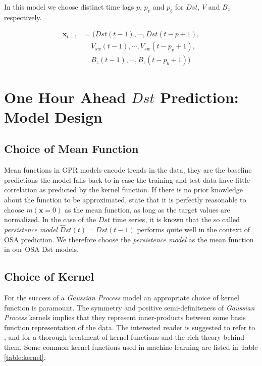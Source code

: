 \documentclass{article}
\providecommand{\DIFadd}[1]{{\protect\color{blue}\uwave{#1}}} %
\providecommand{\DIFdel}[1]{{\protect\color{red}\sout{#1}}}                      %
\providecommand{\DIFaddbegin}{} %
\providecommand{\DIFaddend}{} %
\providecommand{\DIFdelbegin}{} %
\providecommand{\DIFdelend}{} %
\newcommand{\DIFscaledelfig}{0.5}
\newlength{\DIFdelgraphicswidth} %
\newlength{\DIFdelgraphicsheight} %
\newcommand{\DIFaddincludegraphics}[2][]{{\color{blue}\fbox{\DIFOincludegraphics[#1]{#2}}}} %
\newcommand{\DIFdelincludegraphics}[2][]{%
\sbox{\DIFdelgraphicsbox}{\DIFOincludegraphics[#1]{#2}}%
\settoboxwidth{\DIFdelgraphicswidth}{\DIFdelgraphicsbox} %
\settoboxtotalheight{\DIFdelgraphicsheight}{\DIFdelgraphicsbox} %
\scalebox{\DIFscaledelfig}{%
\parbox[b]{\DIFdelgraphicswidth}{\usebox{\DIFdelgraphicsbox}\\[-\baselineskip] \rule{\DIFdelgraphicswidth}{0em}}\llap{\resizebox{\DIFdelgraphicswidth}{\DIFdelgraphicsheight}{%
\setlength{\unitlength}{\DIFdelgraphicswidth}%
\begin{picture}(1,1)%
\thicklines\linethickness{2pt} %
{\color[rgb]{1,0,0}\put(0,0){\framebox(1,1){}}}%
{\color[rgb]{1,0,0}\put(0,0){\line( 1,1){1}}}%
{\color[rgb]{1,0,0}\put(0,1){\line(1,-1){1}}}%
\end{picture}%
}\hspace*{3pt}}} %
} %
\DeclareRobustCommand{\DIFaddbegin}{\DIFOaddbegin \let\includegraphics\DIFaddincludegraphics} %
\DeclareRobustCommand{\DIFaddend}{\DIFOaddend \let\includegraphics\DIFOincludegraphics} %
\DeclareRobustCommand{\DIFdelbegin}{\DIFOdelbegin \let\includegraphics\DIFdelincludegraphics} %
\DeclareRobustCommand{\DIFdelend}{\DIFOaddend \let\includegraphics\DIFOincludegraphics} %
\begin{document}
In this model we choose distinct time lags $p$, $p_{v}$ and $p_{b}$ for $Dst$, $V$ and $B_z$ respectively.

\begin{align*}
  \mathbf{x}_{t-1} & = (Dst(t-1), \cdots , Dst(t-p+1), \\
                   & \ \ \ \ \  V_{sw}(t-1), \cdots, V_{sw}(t-p_{v}+1),\\
                   & \ \ \ \ \  B_{z}(t-1), \cdots, B_{z}(t-p_{b}+1))
\end{align*}

\section{One Hour Ahead $Dst$ Prediction: Model Design}\label{sec:modeldesign}

\subsection{Choice of Mean Function}

Mean functions in GPR models encode trends in the data, they are the baseline predictions the model falls back to in case the training and test data have little correlation as predicted by the kernel function. If there is no prior knowledge about the function to be approximated, \citet{Rasmussen:2005:GPM:1162254} state that it is perfectly reasonable to choose $m(\mathbf{x} = 0)$ as the mean function, as long as the target values are normalized. In the case of the $Dst$ time series, it is known that the so called \emph{persistence model} $\hat{D}st(t) = Dst(t-1)$ performs quite well in the context of OSA prediction. We therefore choose the \emph{persistence model} as the mean function in our OSA Dst models.

\subsection{Choice of Kernel}

For the success of a \emph{Gaussian Process} model an appropriate choice of kernel function is paramount. The symmetry and positive semi-definiteness of \emph{Gaussian Process} kernels implies that they represent inner-products between some basis function representation of the data. The interested reader is suggested to refer to \citet{Berlinet2004}, \citet{Scholkopf:2001:LKS:559923} and \citet{hofmann2008} for a thorough treatment of kernel functions and the rich theory behind them. Some common kernel functions used in machine learning are listed in \DIFdelbegin \DIFdel{Table }\DIFdelend \DIFaddbegin \DIFadd{table }\DIFaddend \ref{table:kernel}.
\end{document}
